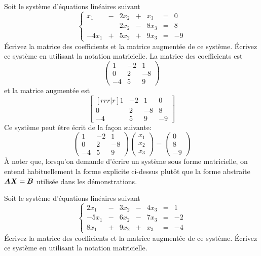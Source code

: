  
 \begin{exemple}
	Soit le système d'équations linéaires suivant
	\[
	\left\{ \begin{matrix}
		x_1 &-& 2x_2 &+& x_3 &=& 0\\
		&& 2x_2 &-& 8x_3 &=& 8\\
		-4x_1 &+& 5x_2 &+& 9x_3 &=& -9
		\end{matrix}\right.
	\]
	 Écrivez la matrice des coefficients et la matrice augmentée de ce système.
	 Écrivez ce système en utilisant la notation matricielle.
	\solution
	 La matrice des coefficients est
	\[
	\begin{pmatrix}
		1 & -2& 1\\
		0 &2& -8\\
		-4 & 5 & 9
	\end{pmatrix}
	\]
	et la matrice augmentée est
	\[
	\begin{bmatrix}[rrr|r]
		1 & -2& 1 & 0\\
		0 &2& -8& 8\\
		-4 & 5 & 9 & -9
	\end{bmatrix}
	\]
	 Ce système peut être écrit de la façon suivante:
	\[
	\begin{pmatrix}
		1 & -2& 1\\
		0 &2& -8\\
		-4 & 5 & 9
	\end{pmatrix}
	\begin{pmatrix} x_1 \\ x_2 \\ x_3 \end{pmatrix}
	=
	\begin{pmatrix} 0 \\ 8 \\ -9 \end{pmatrix}
	\]
	À noter que, lorsqu'on demande d'écrire un système sous forme matricielle,
	on entend habituellement la forme explicite ci-dessus plutôt que la forme
	abstraite $\boldsymbol{A}\boldsymbol{X} = \boldsymbol{B}$ utilisée dans les démonstrations.
\end{exemple}

\begin{exerciceB}
	Soit le système d'équations linéaires suivant
	\[
	\left\{ \begin{matrix}
		2x_1 &-& 3x_2 &-& 4x_3 &=& 1\\
		-5x_1&-& 6x_2 &-& 7x_3 &=& -2\\
		8x_1 &+& 9x_2 &+& x_3 &=& -4
		\end{matrix}\right.
	\]
	 Écrivez la matrice des coefficients et la matrice augmentée de ce système.
	 Écrivez ce système en utilisant la notation matricielle.
\end{exerciceB}

